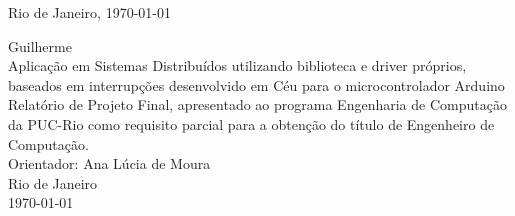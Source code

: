 \documentclass[11pt]{article}
\begin{document}
\begin{titlepage}


{\large Rio de Janeiro, \today}\\[3cm] %



\vfill %

\end{titlepage}



\newpage

\begin{flushright}
\vspace*{\fill}
{\LARGE Guilherme }
\\[2cm]
{\huge Aplicação em Sistemas Distribuídos
utilizando biblioteca e driver próprios,
baseados em interrupções desenvolvido
em Céu para o microcontrolador Arduino}
\\[3cm]
Relatório de Projeto Final, apresentado ao programa
Engenharia de Computação da PUC-Rio como requisito
parcial para a obtenção do título de Engenheiro de Computação.
\\[1cm]
Orientador: Ana Lúcia de Moura
\\[1cm]
Rio de Janeiro
\\\today
\vspace*{\fill}

\end{flushright}
\end{document}
